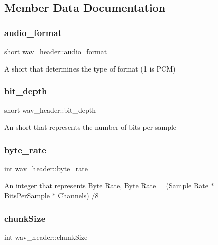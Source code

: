 \subsection{Member Data Documentation}
\mbox{\label{structwav__header_a94c9ee0387f846c47eb9e97636994d93}} 
\subsubsection{\texorpdfstring{audio\+\_\+format}{audio\_format}}
{\footnotesize\ttfamily short wav\+\_\+header\+::audio\+\_\+format}

A short that determines the type of format (1 is P\+CM) \mbox{\label{structwav__header_a63fa60069060bae97c8a64c5b37afa23}} 
\subsubsection{\texorpdfstring{bit\+\_\+depth}{bit\_depth}}
{\footnotesize\ttfamily short wav\+\_\+header\+::bit\+\_\+depth}

An short that represents the number of bits per sample \mbox{\label{structwav__header_a8330740d45200d6aee4ba54fc0d834d8}} 
\subsubsection{\texorpdfstring{byte\+\_\+rate}{byte\_rate}}
{\footnotesize\ttfamily int wav\+\_\+header\+::byte\+\_\+rate}

An integer that represents Byte Rate, Byte Rate = (Sample Rate $\ast$ Bits\+Per\+Sample $\ast$ Channels) /8 \mbox{\label{structwav__header_af71680c0a1a1a432de36737e56153894}} 
\subsubsection{\texorpdfstring{chunk\+Size}{chunkSize}}
{\footnotesize\ttfamily int wav\+\_\+header\+::chunk\+Size}

